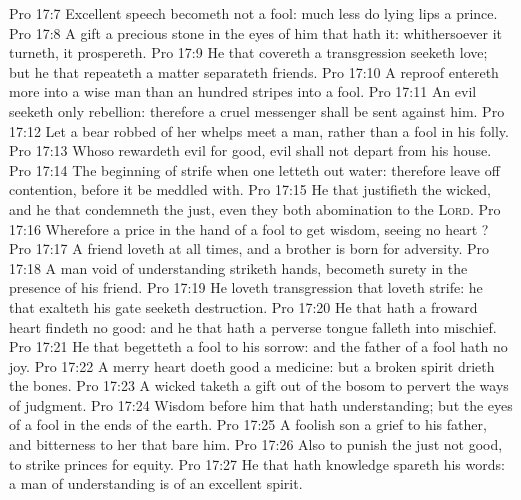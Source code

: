 \vs Pro 17:7 Excellent speech becometh not a fool: much less do lying lips a prince.
\vs Pro 17:8 A gift  a precious stone in the eyes of him that hath it: whithersoever it turneth, it prospereth.
\vs Pro 17:9 He that covereth a transgression seeketh love; but he that repeateth a matter separateth  friends.
\vs Pro 17:10 A reproof entereth more into a wise man than an hundred stripes into a fool.
\vs Pro 17:11 An evil  seeketh only rebellion: therefore a cruel messenger shall be sent against him.
\vs Pro 17:12 Let a bear robbed of her whelps meet a man, rather than a fool in his folly.
\vs Pro 17:13 Whoso rewardeth evil for good, evil shall not depart from his house.
\vs Pro 17:14 The beginning of strife  when one letteth out water: therefore leave off contention, before it be meddled with.
\vs Pro 17:15 He that justifieth the wicked, and he that condemneth the just, even they both  abomination to the \textsc{Lord}.
\vs Pro 17:16 Wherefore  a price in the hand of a fool to get wisdom, seeing  no heart ?
\vs Pro 17:17 A friend loveth at all times, and a brother is born for adversity.
\vs Pro 17:18 A man void of understanding striketh hands,  becometh surety in the presence of his friend.
\vs Pro 17:19 He loveth transgression that loveth strife:  he that exalteth his gate seeketh destruction.
\vs Pro 17:20 He that hath a froward heart findeth no good: and he that hath a perverse tongue falleth into mischief.
\vs Pro 17:21 He that begetteth a fool  to his sorrow: and the father of a fool hath no joy.
\vs Pro 17:22 A merry heart doeth good  a medicine: but a broken spirit drieth the bones.
\vs Pro 17:23 A wicked  taketh a gift out of the bosom to pervert the ways of judgment.
\vs Pro 17:24 Wisdom  before him that hath understanding; but the eyes of a fool  in the ends of the earth.
\vs Pro 17:25 A foolish son  a grief to his father, and bitterness to her that bare him.
\vs Pro 17:26 Also to punish the just  not good,  to strike princes for equity.
\vs Pro 17:27 He that hath knowledge spareth his words:  a man of understanding is of an excellent spirit.

